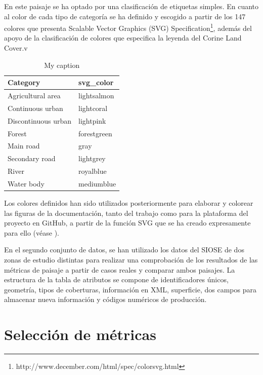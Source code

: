 En este paisaje se ha optado por una clasificación de etiquetas simples. En cuanto al color de cada tipo de categoría se ha definido y escogido a partir de los 147 colores que presenta Scalable Vector Graphics (SVG) Specification\footnote{http://www.december.com/html/spec/colorsvg.html}, además del apoyo de la clasificación de colores que especifica la leyenda del Corine Land Cover.v

\begin{table}[]
\centering
\caption{My caption}
\label{my-label}
\begin{tabular}{@{}ll@{}}
\toprule
\textbf{Category}   & \textbf{svg\_color} \\ \midrule
Agricultural area   & lightsalmon            \\
Continuous urban    & lightcoral             \\
Discontinuous urban & lightpink              \\
Forest              & forestgreen            \\
Main road           & gray                   \\
Secondary road      & lightgrey              \\
River               & royalblue              \\
Water body          & mediumblue             \\ \bottomrule
\end{tabular}
\end{table}

Los colores definidos han sido utilizados posteriormente para elaborar y colorear las figuras de la documentación, tanto del trabajo como para la plataforma del proyecto en GitHub, a partir de la función SVG que se ha creado expresamente para ello (véase \label{sec:Documentación de la extensión}).

En el segundo conjunto de datos, se han utilizado los datos del SIOSE de dos zonas de estudio distintas para realizar una comprobación de los resultados de las métricas de paisaje a partir de casos reales y comparar ambos paisajes. La estructura de la tabla de atributos se compone de identificadores únicos, geometría, tipos de coberturas, información en XML, superficie, dos campos para almacenar nueva información y códigos numéricos de producción.




\section{Selección de métricas}

